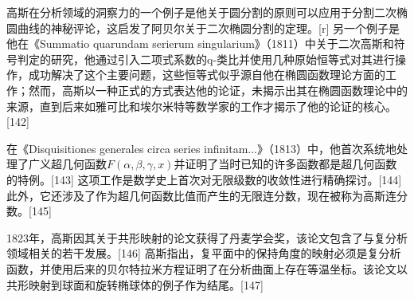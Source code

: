 高斯在分析领域的洞察力的一个例子是他关于圆分割的原则可以应用于分割二次椭圆曲线的神秘评论，这启发了阿贝尔关于二次椭圆分割的定理。[r] 另一个例子是他在《Summatio quarundam serierum singularium》（1811）中关于二次高斯和符号判定的研究，他通过引入二项式系数的q-类比并使用几种原始恒等式对其进行操作，成功解决了这个主要问题，这些恒等式似乎源自他在椭圆函数理论方面的工作；然而，高斯以一种正式的方式表达他的论证，未揭示出其在椭圆函数理论中的来源，直到后来如雅可比和埃尔米特等数学家的工作才揭示了他的论证的核心。[142]

在《Disquisitiones generales circa series infinitam...》（1813）中，他首次系统地处理了广义超几何函数\(F(\alpha, \beta, \gamma, x)\)并证明了当时已知的许多函数都是超几何函数的特例。[143] 这项工作是数学史上首次对无限级数的收敛性进行精确探讨。[144] 此外，它还涉及了作为超几何函数比值而产生的无限连分数，现在被称为高斯连分数。[145]

1823年，高斯因其关于共形映射的论文获得了丹麦学会奖，该论文包含了与复分析领域相关的若干发展。[146] 高斯指出，复平面中的保持角度的映射必须是复分析函数，并使用后来的贝尔特拉米方程证明了在分析曲面上存在等温坐标。该论文以共形映射到球面和旋转椭球体的例子作为结尾。[147]